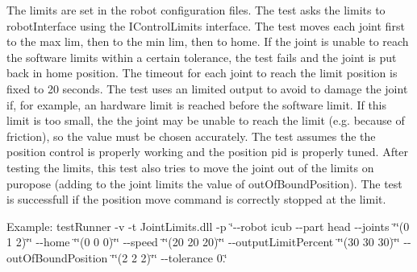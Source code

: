 The limits are set in the robot configuration files. The test asks the limits to robot\+Interface using the I\+Control\+Limits interface. The test moves each joint first to the max lim, then to the min lim, then to home. If the joint is unable to reach the software limits within a certain tolerance, the test fails and the joint is put back in home position. The timeout for each joint to reach the limit position is fixed to 20 seconds. The test uses an limited output to avoid to damage the joint if, for example, an hardware limit is reached before the software limit. If this limit is too small, the the joint may be unable to reach the limit (e.\+g. because of friction), so the value must be chosen accurately. The test assumes the the position control is properly working and the position pid is properly tuned. After testing the limits, this test also tries to move the joint out of the limits on puropose (adding to the joint limits the value of out\+Of\+Bound\+Position). The test is successfull if the position move command is correctly stopped at the limit.

Example\+: test\+Runner -\/v -\/t Joint\+Limits.\+dll -\/p \char`\"{}-\/-\/robot icub -\/-\/part head -\/-\/joints \char`\"{}\char`\"{}(0 1 2)\char`\"{}\char`\"{} -\/-\/home \char`\"{}\char`\"{}(0 0 0)\char`\"{}\char`\"{} -\/-\/speed \char`\"{}\char`\"{}(20 20 20)\char`\"{}\char`\"{} -\/-\/output\+Limit\+Percent \char`\"{}\char`\"{}(30 30 30)\char`\"{}\char`\"{} -\/-\/out\+Of\+Bound\+Position \char`\"{}\char`\"{}(2 2 2)\char`\"{}\char`\"{} -\/-\/tolerance 0.\char`\"{}

